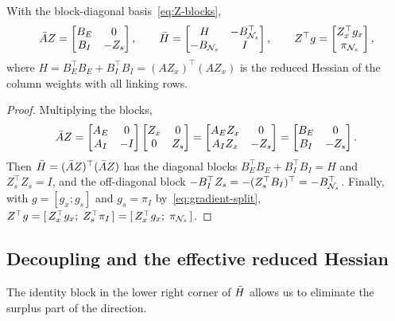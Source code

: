 \begin{lemma} \label{lem:reduced-blocks}
With the block-diagonal basis~\eqref{eq:Z-blocks},
\[
\bar{A} Z = \begin{bmatrix} B_E & 0\\ B_I & -Z_s\end{bmatrix},\qquad
\bar{H} = \begin{bmatrix} H & -B_{\mathcal{N}_s}^\top\\ -B_{\mathcal{N}_s} & I\end{bmatrix},\qquad
Z^\top g = \begin{bmatrix} Z_x^\top g_x\\ \pi_{\mathcal{N}_s}\end{bmatrix},
\]
where $H = B_E^\top B_E + B_I^\top B_I = (AZ_x)^\top(AZ_x)$ is the reduced Hessian of the column
weights with all linking rows.
\end{lemma}

\begin{proof}
Multiplying the blocks,
\[
\bar{A} Z = \begin{bmatrix} A_E & 0\\ A_I & -I\end{bmatrix}\begin{bmatrix} Z_x & 0\\ 0 & Z_s\end{bmatrix}
= \begin{bmatrix} A_EZ_x & 0\\ A_IZ_x & -Z_s\end{bmatrix}
= \begin{bmatrix} B_E & 0\\ B_I & -Z_s\end{bmatrix}.
\]
Then $\bar{H} = (\bar{A} Z)^\top(\bar{A} Z)$ has the diagonal blocks $B_E^\top B_E + B_I^\top B_I = H$
and $Z_s^\top Z_s = I$, and the off-diagonal block $-B_I^\top Z_s = -(Z_s^\top B_I)^\top = -B_{\mathcal{N}_s}^\top$.
Finally, with $g = [g_x; g_s]$ and $g_s = \pi_I$ by~\eqref{eq:gradient-split},
$Z^\top g = [\,Z_x^\top g_x;\; Z_s^\top\pi_I\,] = [\,Z_x^\top g_x;\; \pi_{\mathcal{N}_s}\,]$.
\end{proof}

\subsection{Decoupling and the effective reduced Hessian}

The identity block in the lower right corner of $\bar{H}$ allows us to eliminate the surplus
part of the direction.

